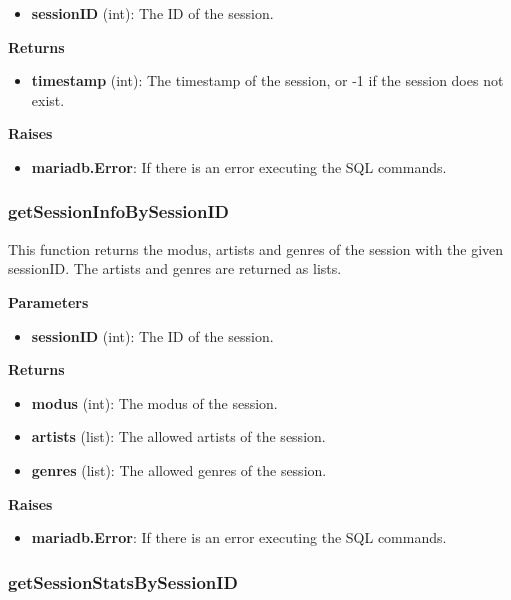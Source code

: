 \documentclass[oneside, ngerman]{sdqtechreport}
\begin{document}
\begin{itemize} \item \textbf{sessionID} (int): The ID of the session. \end{itemize}

\textbf{Returns}

\begin{itemize} \item \textbf{timestamp} (int): The timestamp of the session, or -1 if the session does not exist. \end{itemize}

\textbf{Raises}

\begin{itemize} \item \textbf{mariadb.Error}: If there is an error executing the SQL commands. \end{itemize}

\subsubsection{getSessionInfoBySessionID}

This function returns the modus, artists and genres of the session with the given sessionID. The artists and genres are returned as lists.

\textbf{Parameters}

\begin{itemize} \item \textbf{sessionID} (int): The ID of the session. \end{itemize}

\textbf{Returns}

\begin{itemize} \item \textbf{modus} (int): The modus of the session. \item \textbf{artists} (list): The allowed artists of the session. \item \textbf{genres} (list): The allowed genres of the session. \end{itemize}

\textbf{Raises}

\begin{itemize} \item \textbf{mariadb.Error}: If there is an error executing the SQL commands. \end{itemize}


\subsubsection{getSessionStatsBySessionID}
\end{document}
